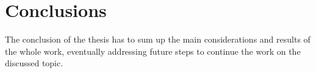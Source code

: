 %
%	 
%

\chapter*{Conclusions}

The conclusion of the thesis has to sum up the main considerations and results of the whole work, eventually addressing future steps to continue the work on the discussed topic.